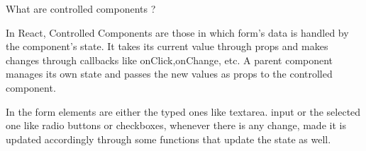 What are controlled components ?

In React, Controlled Components are those in which form’s data is 
handled by the component’s state. It takes its current value through 
props and makes changes through callbacks like onClick,onChange, etc. 
A parent component manages its own state and passes the new values as 
props to the controlled component.

In the form elements are either the typed ones like textarea. 
input or the selected one like radio buttons or checkboxes, whenever 
there is any change, made it is updated accordingly through some functions 
that update the state as well.